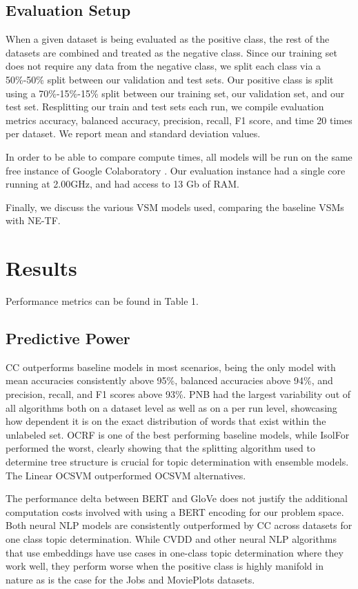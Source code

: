 \documentclass[11pt]{article}
\begin{document}
\subsection{Evaluation Setup}
When a given dataset is being evaluated as the positive class, the rest of the datasets are combined and treated as the negative class. Since our training set does not require any data from the negative class, we split each class via a 50\%-50\% split between our validation and test sets. Our positive class is split using a 70\%-15\%-15\% split between our training set, our validation set, and our test set. Resplitting our train and test sets each run, we compile evaluation metrics accuracy, balanced accuracy,  precision, recall, F1 score, and time 20 times per dataset. We report mean and standard deviation values.

In order to be able to compare compute times, all models will be run on the same free instance of Google Colaboratory \cite{colab}. Our evaluation instance had a single core running at 2.00GHz, and had access to 13 Gb of RAM.

Finally, we discuss the various VSM models used, comparing the baseline VSMs with NE-TF.

\section{Results}
Performance metrics can be found in Table 1.

\subsection{Predictive Power}
CC outperforms baseline models in most scenarios, being the only model with mean accuracies consistently above 95\%, balanced accuracies above 94\%, and precision, recall, and F1 scores above 93\%. PNB had the largest variability out of all algorithms both on a dataset level as well as on a per run level, showcasing how dependent it is on the exact distribution of words that exist within the unlabeled set. OCRF is one of the best performing baseline models, while IsolFor performed the worst, clearly showing that the splitting algorithm used to determine tree structure is crucial for topic determination with ensemble models. The Linear OCSVM outperformed OCSVM alternatives.

The performance delta between BERT and GloVe does not justify the additional computation costs involved with using a BERT encoding for our problem space. Both neural NLP models are consistently outperformed by CC across datasets for one class topic determination. While CVDD and other neural NLP algorithms that use embeddings have use cases in one-class topic determination where they work well, they perform worse when the positive class is highly manifold in nature as is the case for the Jobs and MoviePlots datasets.
\end{document}
